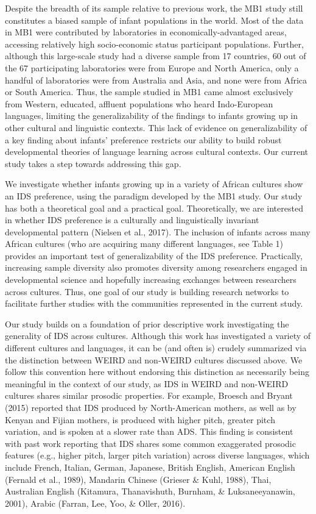 \documentclass[
  english,
  ,man,floatsintext]{apa6}
\begin{document}
Despite the breadth of its sample relative to previous work, the MB1 study still constitutes a biased sample of infant populations in the world. Most of the data in MB1 were contributed by laboratories in economically-advantaged areas, accessing relatively high socio-economic status participant populations. Further, although this large-scale study had a diverse sample from 17 countries, 60 out of the 67 participating laboratories were from Europe and North America, only a handful of laboratories were from Australia and Asia, and none were from Africa or South America. Thus, the sample studied in MB1 came almost exclusively from Western, educated, affluent populations who heard Indo-European languages, limiting the generalizability of the findings to infants growing up in other cultural and linguistic contexts. This lack of evidence on generalizability of a key finding about infants' preference restricts our ability to build robust developmental theories of language learning across cultural contexts. Our current study takes a step towards addressing this gap.

We investigate whether infants growing up in a variety of African cultures show an IDS preference, using the paradigm developed by the MB1 study. Our study has both a theoretical goal and a practical goal. Theoretically, we are interested in whether IDS preference is a culturally and linguistically invariant developmental pattern (Nielsen et al., 2017). The inclusion of infants across many African cultures (who are acquiring many different languages, see Table 1) provides an important test of generalizability of the IDS preference. Practically, increasing sample diversity also promotes diversity among researchers engaged in developmental science and hopefully increasing exchanges between researchers across cultures. Thus, one goal of our study is building research networks to facilitate further studies with the communities represented in the current study.

Our study builds on a foundation of prior descriptive work investigating the generality of IDS across cultures. Although this work has investigated a variety of different cultures and languages, it can be (and often is) crudely summarized via the distinction between WEIRD and non-WEIRD cultures discussed above. We follow this convention here without endorsing this distinction as necessarily being meaningful in the context of our study, as IDS in WEIRD and non-WEIRD cultures shares similar prosodic properties. For example, Broesch and Bryant (2015) reported that IDS produced by North-American mothers, as well as by Kenyan and Fijian mothers, is produced with higher pitch, greater pitch variation, and is spoken at a slower rate than ADS. This finding is consistent with past work reporting that IDS shares some common exaggerated prosodic features (e.g., higher pitch, larger pitch variation) across diverse languages, which include French, Italian, German, Japanese, British English, American English (Fernald et al., 1989), Mandarin Chinese (Grieser \& Kuhl, 1988), Thai, Australian English (Kitamura, Thanavishuth, Burnham, \& Luksaneeyanawin, 2001), Arabic (Farran, Lee, Yoo, \& Oller, 2016).
\end{document}
